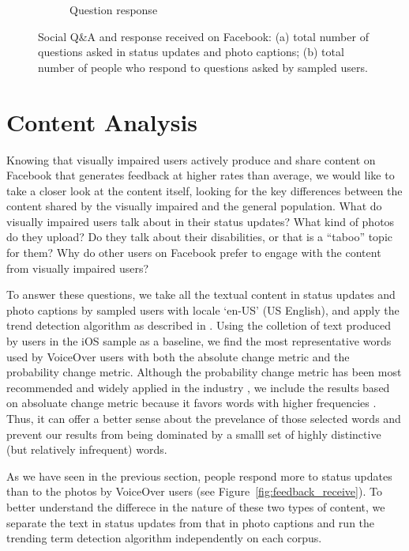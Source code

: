 \documentclass{sigchi}
\begin{document}
\begin{figure}
\begin{subfigure}[b]{0.23\textwidth}
    \caption{Question response}
    \label{fig:question_response}
 \end{subfigure}
 \caption{Social Q\&A and response received on Facebook: (a) total number of questions asked in status updates and photo captions; (b) total number of people who respond to questions asked by sampled users.}
\label{fig:question}
\end{figure}

\section{Content Analysis}

Knowing that visually impaired users actively produce and share content on Facebook that generates feedback at higher rates than average, we would like to take a closer look at the content itself, looking for the key differences between the content shared by the visually impaired and the general population. What do visually impaired users talk about in their status updates? What kind of photos do they upload? Do they talk about their disabilities, or that is a ``taboo'' topic for them? Why do other users on Facebook prefer to engage with the content from visually impaired users?

To answer these questions, we take all the textual content in status updates and photo captions by sampled users with locale `en-US' (US English),  and apply the trend detection algorithm as described in \cite{kleinberg2004}.  Using the colletion of text produced by users in the iOS sample as a baseline, we find the most representative words used by VoiceOver users with both the absolute change metric and the probability change metric. Although the probability change metric has been most recommended and widely applied in the industry \cite{FacebookTrend}, we include the results based on absoluate change metric because it favors words with higher frequencies \cite{kleinberg2004}. Thus, it can offer a better sense about the prevelance of those selected words and prevent our results from being dominated by a smalll set of highly distinctive (but relatively infrequent) words. 

As we have seen in the previous section, people respond more to status updates than to the photos by VoiceOver users (see Figure~\ref{fig:feedback_receive}). To better understand the differece in the nature of these two types of content, we separate the text in status updates from that in photo captions and run the trending term detection algorithm independently on each corpus. 
\end{document}
